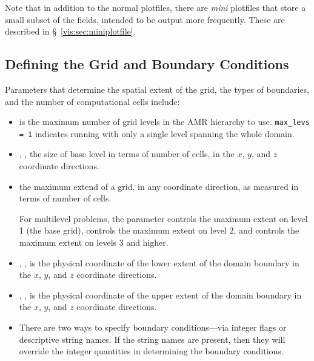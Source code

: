 Note that in addition to the normal plotfiles, there are {\em mini} plotfiles
that store a small subset of the fields, intended to be output more frequently.
These are described in \S~\ref{vis:sec:miniplotfile}.

\subsection{Defining the Grid and Boundary Conditions}

Parameters that determine the spatial extent of the grid, 
the types of boundaries, and the number of computational cells include:
\begin{itemize}

\item {} is the maximum number of grid levels in the AMR
  hierarchy to use.  {\tt max\_levs = 1} indicates running with only a
  single level spanning the whole domain.

\item {}, ,  the size of
  base level in terms of number of cells, in the $x$, $y$, and $z$
  coordinate directions.

\item {} the maximum extend of a grid, in any
  coordinate direction, as measured in terms of number of cells.

  For multilevel problems, the parameter 
  controls the maximum extent on level 1 (the base
  grid),  controls the maximum extent on
  level 2, and  controls the maximum extent on
  levels 3 and higher.

\item {}, ,  is
  the physical coordinate of the lower extent of the domain boundary
  in the $x$, $y$, and $z$ coordinate directions.

\item {}, ,  is
  the physical coordinate of the upper extent of the domain boundary
  in the $x$, $y$, and $z$ coordinate directions.

\item There are two ways to specify boundary conditions---via integer flags
      or descriptive string names.  If the string names are present,
      then they will override the integer quantities in determining
      the boundary conditions.


\end{itemize}
